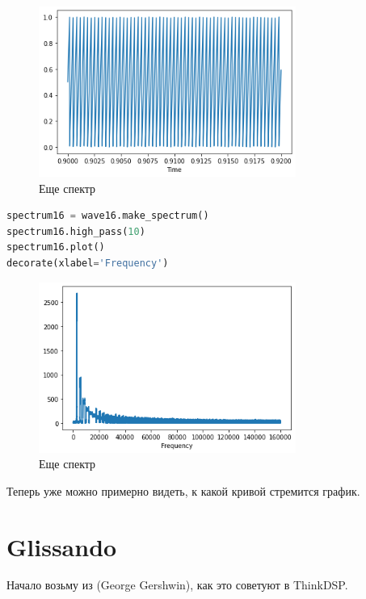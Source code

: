 \documentclass[a4paper,12pt]{report}
\begin{document}
    \begin{figure}[H]
        \centering
        \includegraphics[width=0.75\textwidth]{ex3_signal16.png}
        \caption{Еще спектр}
        \label{fig:ex3_signal16}
    \end{figure}
    
\begin{lstlisting}[language=Python,caption=Новый спектр]
spectrum16 = wave16.make_spectrum()
spectrum16.high_pass(10)
spectrum16.plot()
decorate(xlabel='Frequency')
\end{lstlisting}

    \begin{figure}[H]
        \centering
        \includegraphics[width=0.75\textwidth]{ex3_spectrum16.png}
        \caption{Еще спектр}
        \label{fig:ex3_spectrum16}
    \end{figure}
    
    Теперь уже можно примерно видеть, к какой кривой стремится график.
    
    \chapter{Glissando}
    
    Начало возьму из  (George Gershwin), как это советуют в ThinkDSP.
    
\end{document}
